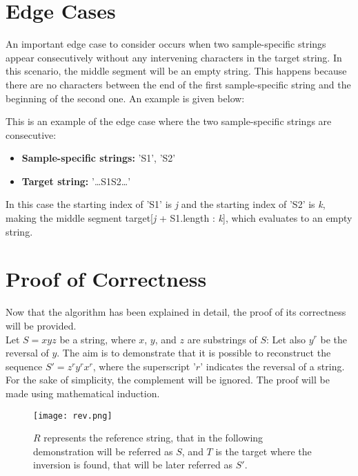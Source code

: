 \section{Edge Cases}
An important edge case to consider occurs when two sample-specific strings appear consecutively without any intervening characters in the target string. In this scenario, the middle segment will be an empty string. This happens because there are no characters between the end of the first sample-specific string and the beginning of the second one. An example is given below:

\begin{example}
  This is an example of the edge case where the two sample-specific strings are consecutive:
\begin{itemize}
    \item \textbf{Sample-specific strings: } 'S1', 'S2'
    \item \textbf{Target string: }  '\dots S1S2\dots'
\end{itemize}
\end{example}


In this case the starting index of 'S1' is \textit{j} and the starting index of 'S2' is \textit{k}, making the middle segment target[\textit{j} + S1.length : \textit{k}], which evaluates to an empty string.

\section{Proof of Correctness}

Now that the algorithm has been explained in detail, the proof of its correctness will be provided. \\
Let \( S = xyz \) be a string, where \( x \), \( y \), and \( z \) are substrings of \( S \): Let also \(y^r \) be the reversal of \( y \). The aim is to demonstrate that it is possible to reconstruct the sequence \( S' = z^r y^r x^r \), where the superscript '\( r \)' indicates the reversal of a string. For the sake of simplicity, the complement will be ignored. The proof will be made using mathematical induction. 

\begin{figure}[h]

  \centering
    \texttt{[image: rev.png]}

  \caption{\( R \) represents the reference string, that in the following demonstration will be referred as \( S \), and \( T \) is the target where the inversion is found, that will be later referred as \( S' \).}
  \label{fig:rev}

\end{figure}

